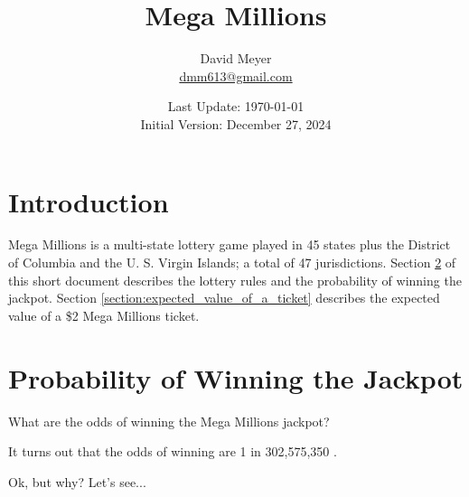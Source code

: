 \documentclass{article}
\title{Mega Millions}
\author{David Meyer \\ \href{mailto:dmm613@gmail.com}
                            {dmm613@gmail.com}}
\date{Last Update: \today \\
	 {\vspace{1.00mm} \small Initial Version: December 27, 2024}}
\theoremstyle{definition}
\begin{document}
\maketitle
%
%
%
\section{Introduction}
\label{section:introduction}
Mega Millions\textregistered \hspace{0.25mm} is a multi-state
lottery game played in 45 states plus the District of Columbia
and the U. S. Virgin Islands; a total of 47
jurisdictions. Section
\ref{section:probability_of_winning_the_jackpot} of this short
document describes the lottery rules and the probability of
winning the jackpot. Section
\ref{section:expected_value_of_a_ticket} describes the
expected value of a \$2 Mega Millions ticket.


\section{Probability of Winning the Jackpot}
\label{section:probability_of_winning_the_jackpot}
What are the odds of winning the Mega Millions jackpot?

\bigskip
\noindent
It turns out that the odds of winning are 1 in 302,575,350
\cite{mega_millions}. 

\bigskip
\noindent
Ok, but why? Let's see...
\end{document}
